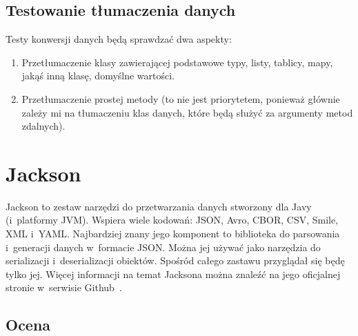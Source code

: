 \subsection{Testowanie tłumaczenia danych}
Testy konwersji danych będą sprawdzać dwa aspekty:
\begin{enumerate}
	\item Przetłumaczenie klasy zawierającej podstawowe typy, listy, tablicy, mapy, jakąś inną klasę, domyślne wartości.
	\item Przetłumaczenie prostej metody (to nie jest priorytetem, ponieważ głównie zależy mi na tłumaczeniu klas danych, które będą służyć za argumenty metod zdalnych).
\end{enumerate}



\section{Jackson}
\label{jackson}
Jackson to zestaw narzędzi do przetwarzania danych stworzony dla Javy (i~platformy JVM).
Wspiera wiele kodowań: JSON, Avro, CBOR, CSV, Smile, XML i~YAML.
Najbardziej znany jego komponent to biblioteka do parsowania i~generacji danych w~formacie JSON.
Można jej używać jako narzędzia do serializacji i~deserializacji obiektów.
Spośród całego zastawu przyglądał się będę tylko jej.
Więcej informacji na temat Jacksona można znaleźć na jego oficjalnej stronie w~serwisie Github~\cite{jackson}.

\subsection{Ocena}

